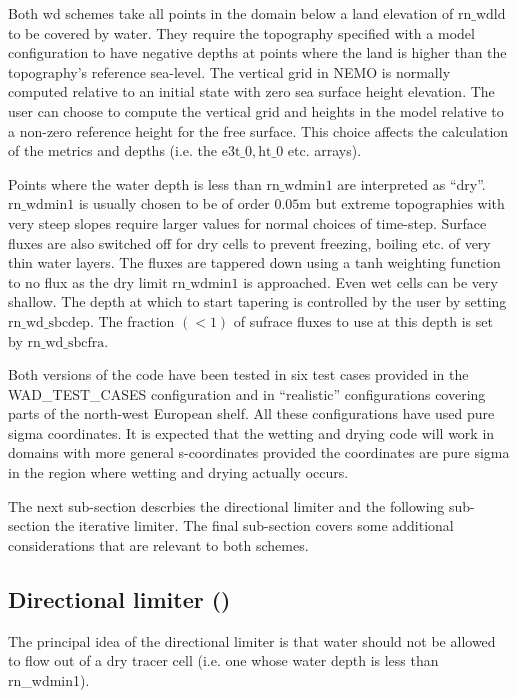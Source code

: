 \documentclass[../main/NEMO_manual]{subfiles}
\begin{document}
Both wd schemes take all points in the domain below a land elevation of $\mathrm{rn\_wdld}$ to be
covered by water. They require the topography specified with a model
configuration to have negative depths at points where the land is higher than the
topography's reference sea-level. The vertical grid in NEMO is normally computed relative to an
initial state with zero sea surface height elevation.
The user can choose to compute the vertical grid and heights in the model relative to
a non-zero reference height for the free surface. This choice affects the calculation of the metrics and depths
(i.e. the $\mathrm{e3t\_0, ht\_0}$ etc. arrays).

Points where the water depth is less than $\mathrm{rn\_wdmin1}$ are interpreted as ``dry''.
$\mathrm{rn\_wdmin1}$ is usually chosen to be of order $0.05$m but extreme topographies
with very steep slopes require larger values for normal choices of time-step. Surface fluxes
are also switched off for dry cells to prevent freezing, boiling etc. of very thin water layers.
The fluxes are tappered down using a $\mathrm{tanh}$ weighting function
to no flux as the dry limit $\mathrm{rn\_wdmin1}$ is approached. Even wet cells can be very shallow.
The depth at which to start tapering is controlled by the user by setting $\mathrm{rn\_wd\_sbcdep}$.
The fraction $(<1)$ of sufrace fluxes to use at this depth is set by $\mathrm{rn\_wd\_sbcfra}$.

Both versions of the code have been tested in six test cases provided in the WAD\_TEST\_CASES configuration
and in ``realistic'' configurations covering parts of the north-west European shelf.
All these configurations have used pure sigma coordinates. It is expected that
the wetting and drying code will work in domains with more general s-coordinates provided
the coordinates are pure sigma in the region where wetting and drying actually occurs. 

The next sub-section descrbies the directional limiter and the following sub-section the iterative limiter.
The final sub-section covers some additional considerations that are relevant to both schemes.


\subsection   [Directional limiter (\textit{wet\_dry})]
         {Directional limiter ()}
\label{subsec:DYN_wd_directional_limiter}
The principal idea of the directional limiter is that
water should not be allowed to flow out of a dry tracer cell (i.e. one whose water depth is less than rn\_wdmin1).
\end{document}
